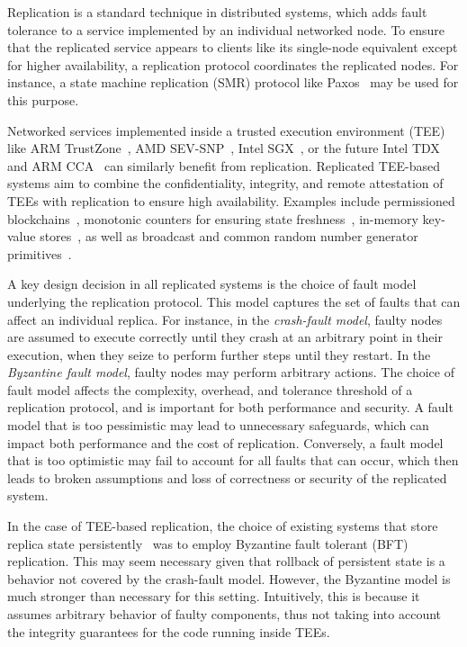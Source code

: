 
Replication is a standard technique in distributed systems, which adds
fault tolerance to a service implemented by an individual networked
node. To ensure that the replicated service appears to clients like
its single-node equivalent except for higher availability, a
replication protocol coordinates the replicated
nodes. For instance, a state machine replication (SMR) protocol like
Paxos~\cite{paxos} may be used for this purpose.

Networked services implemented inside a trusted execution environment
(TEE) like ARM TrustZone~\cite{armTZ}, AMD SEV-SNP~\cite{amdsev,
  amdsev-snp}, Intel SGX~\cite{intelsgx}, or the future Intel
TDX~\cite{inteltdx} and ARM CCA~\cite{arm-cca} can similarly benefit
from replication.  Replicated \ac{TEE}-based systems aim to combine the
confidentiality, integrity, and remote attestation of \acp{TEE} with
replication to ensure high availability.
Examples include permissioned blockchains~\cite{teechain}, monotonic
counters for ensuring state freshness~\cite{rote}, in-memory key-value
stores~\cite{avocado-atc21}, as well as broadcast and common random
number generator primitives~\cite{p2p-sgx}.

A key design decision in all replicated systems is the choice of fault
model underlying the replication protocol. This model captures the set
of faults that can affect an individual replica.  For instance, in the
{\em crash-fault model}, faulty nodes are assumed to execute correctly
until they crash at an arbitrary point in their execution, when they
seize to perform further steps until they restart. In the {\em
  Byzantine fault model}, faulty nodes may perform arbitrary
actions. The choice of fault model affects the complexity, overhead,
and tolerance threshold of a replication protocol, and is important
for both performance and security. A fault model that is too
pessimistic may lead to unnecessary safeguards, which can impact both
performance and the cost of replication. Conversely, a fault model
that is too optimistic may fail to account for all faults that can
occur, which then leads to broken assumptions and loss of correctness
or security of the replicated system.

In the case of \ac{TEE}-based replication, the choice of existing systems
that store replica state persistently~\cite{teechain,rote} was to
employ Byzantine fault tolerant (BFT) replication. This may seem
necessary given that rollback of persistent state is a behavior not
covered by the crash-fault model.  However, the Byzantine model is
much stronger than necessary for this setting. Intuitively, this
is because it assumes arbitrary behavior of
faulty components, thus not taking into account the integrity
guarantees for the code running inside \acp{TEE}.

